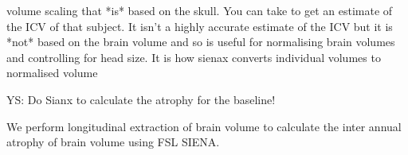 \documentclass[twoside,onecolumn]{article}
\begin{document}



volume scaling that *is* based on the skull. 
You can take
to get an estimate of the ICV of that subject. It isn't a highly accurate
estimate of the ICV but it is *not* based on the brain volume and so is
useful for normalising brain volumes and controlling for head size.
It is how sienax converts individual volumes to normalised volume

YS: Do Sianx to calculate the atrophy for the baseline!

We perform longitudinal extraction of brain volume to calculate the inter annual atrophy of brain volume using FSL SIENA.
\end{document}
